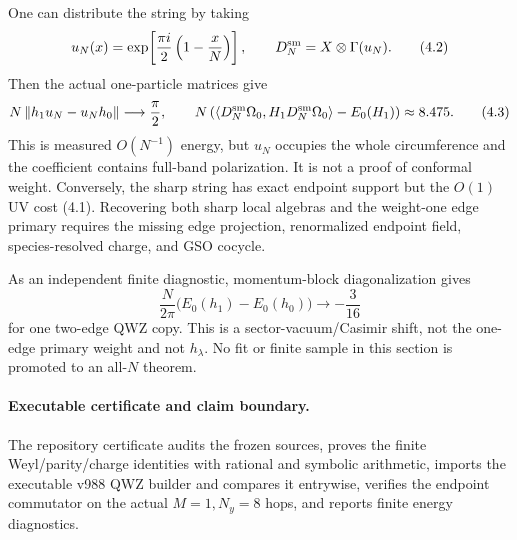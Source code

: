 One can distribute the string by taking
\[
 u_N(x)=\exp\!\left[\frac{\pi i}{2}\left(1-\frac{x}{N}\right)\right],
 \qquad D_N^{\rm sm}=X\otimes\Gamma(u_N).
\tag{4.2}
\]
Then the actual one-particle matrices give
\[
 N\left\lVert h_1u_N-u_Nh_0\right\rVert\longrightarrow\frac\pi2,\qquad
 N\left(\langle D_N^{\rm sm}\Omega_0,H_1D_N^{\rm sm}\Omega_0\rangle
 -E_0(H_1)\right)\approx8.475.
\tag{4.3}
\]
This is measured $O(N^{-1})$ energy, but $u_N$ occupies the whole
circumference and the coefficient contains full-band polarization.  It is
not a proof of conformal weight.  Conversely, the sharp string has exact
endpoint support but the $O(1)$ UV cost (4.1).  Recovering both sharp local
algebras and the weight-one edge primary requires the missing edge projection,
renormalized endpoint field, species-resolved charge, and GSO cocycle.

As an independent finite diagnostic, momentum-block diagonalization gives
\[
 \frac{N}{2\pi}\bigl(E_0(h_1)-E_0(h_0)\bigr)\longrightarrow-\frac3{16}
\tag{4.4}
\]
for one two-edge QWZ copy.  This is a sector-vacuum/Casimir shift, not the
one-edge primary weight and not $h_\lambda$.  No fit or finite sample in this
section is promoted to an all-$N$ theorem.

\paragraph{Executable certificate and claim boundary.}

The repository certificate 
audits the frozen sources, proves the finite Weyl/parity/charge identities
with rational and symbolic arithmetic, imports the executable v988 QWZ
builder and compares it entrywise, verifies the endpoint commutator on the
actual $M=1,N_y=8$ hops, and reports finite energy diagnostics.

\begin{center}
\end{center}
\endgroup
